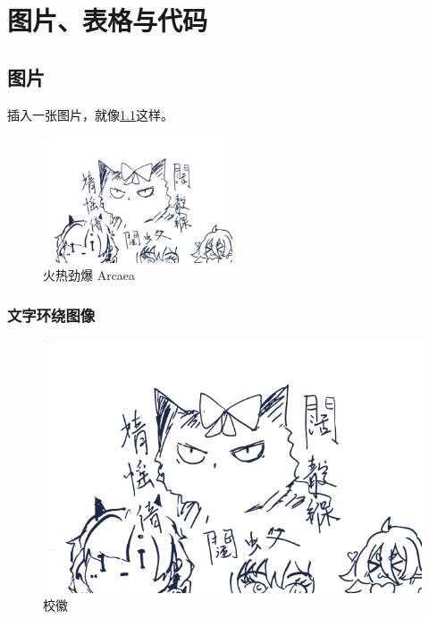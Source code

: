 \chapter{图片、表格与代码}

\section{图片}

插入一张图片，就像\cref{fig:arcaea}这样。

\begin{figure}[htbp]
    \centering
    \includegraphics[width=0.5\textwidth]{test.png}
    \caption{火热劲爆 Arcaea}
    \label{fig:arcaea}
\end{figure}
\zhlipsum[3][name=xiangyu]

\subsection{文字环绕图像}
\begin{figure}
    \label{fig:arcaeaedge}
    \includegraphics[width=.15\textwidth]{test.png}
    \caption{校徽}
\end{figure}
\zhlipsum[2][name=xiangyu]

    
